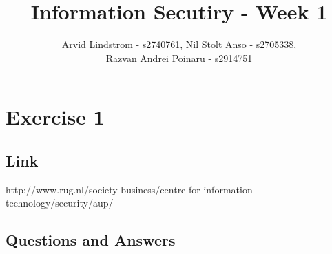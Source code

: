 \documentclass[a4paper]{article}
\title{Information Secutiry - Week 1}
\author{Arvid Lindstrom - s2740761, Nil Stolt Anso - s2705338,\\ Razvan Andrei Poinaru - s2914751}
\begin{document}
\maketitle


\section{Exercise 1}

\subsection{Link}
http://www.rug.nl/society-business/centre-for-information-technology/security/aup/

\subsection{Questions and Answers}
\end{document}
